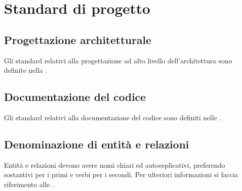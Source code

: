 %


\section{Standard di progetto} %
\label{sec:standard_di_progetto}
	\subsection{Progettazione architetturale} %
	\label{sub:progettazione_architetturale}
	Gli standard relativi alla progettazione ad alto livello dell'architettura sono definite nella \docNameVersionST.


	\subsection{Documentazione del codice} %
	\label{sub:documentazione_del_codice}
	Gli standard relativi alla documentazione del codice sono definiti nelle \docNameVersionNdP.


	\subsection{Denominazione di entità e relazioni} %
	\label{sub:denominazione_di_entita_e_relazioni}
	Entità e relazioni devono avere nomi chiari ed autoesplicativi, preferendo sostantivi per i primi e verbi per i secondi. Per ulteriori informazioni si faccia riferimento alle \docNameVersionNdP.


